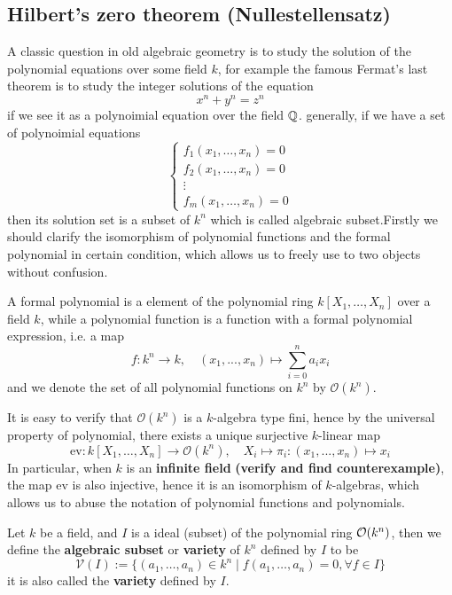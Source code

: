 \newpage


\subsection{Hilbert's zero theorem (Nullestellensatz)}

A classic question in old algebraic geometry is to study the solution of the polynomial equations over some field \(k\), for example the famous Fermat's last theorem is to study the integer solutions of the equation
\[x^n + y^n = z^n\]
if we see it as a polynoimial equation over the field \(\mathbb{Q}\). generally, if we have a set of polynoimial equations
\begin{equation}\label{eq:poly-equations}
    \begin{cases}
    f_1(x_1,\dots,x_n) = 0\\
    f_2(x_1,\dots,x_n) = 0\\
    \vdots \\
    f_m(x_1,\dots,x_n) = 0
    \end{cases}
\end{equation}
then its solution set is a subset of \(k^n\) which is called algebraic subset.Firstly we should clarify the isomorphism of polynomial functions and the formal polynomial in certain condition, which allows us to freely use to two objects without confusion.
\begin{definition}
    A formal polynomial is a element of the polynomial ring \(k[X_1,\dots,X_n]\) over a field \(k\), while a polynomial function is a function with a formal polynomial expression, i.e. a map
    \[f: k^n \to k, \quad (x_1,...,x_n) \mapsto \sum_{i=0}^{n}a_i x_i\]
    and we denote the set of all polynomial functions on \(k^n\) by \(\mathcal{O}(k^n)\).
\end{definition}

It is easy to verify that \(\mathcal{O}(k^n)\) is a \(k\)-algebra type fini, hence by the universal property of polynomial, there exists a unique surjective \(k\)-linear map
\[\mathrm{ev}:k[X_1,\dots,X_n] \to \mathcal{O}(k^n), \quad X_i \mapsto \pi_i: (x_1,...,x_n) \mapsto x_i\]
In particular, when \(k\) is an \textbf{infinite field}\textbf{ (verify and find counterexample)}, the map \(\mathrm{ev}\) is also injective, hence it is an isomorphism of \(k\)-algebras, which allows us to abuse the notation of polynomial functions and polynomials.
\begin{colordefinition}
    Let \(k\) be a field, and \(I\) is a ideal (subset) of the polynomial ring \(\mathcal{O}(k^n)\), then we define the \textbf{algebraic subset} or \textbf{variety} of \(k^n\) defined by \(I\) to be
    \[\mathcal{V}(I) := \{(a_1,\dots,a_n) \in k^n \mid f(a_1,\dots,a_n) = 0, \forall f \in I\}\]
    it is also called the \textbf{variety} defined by \(I\).
\end{colordefinition}

